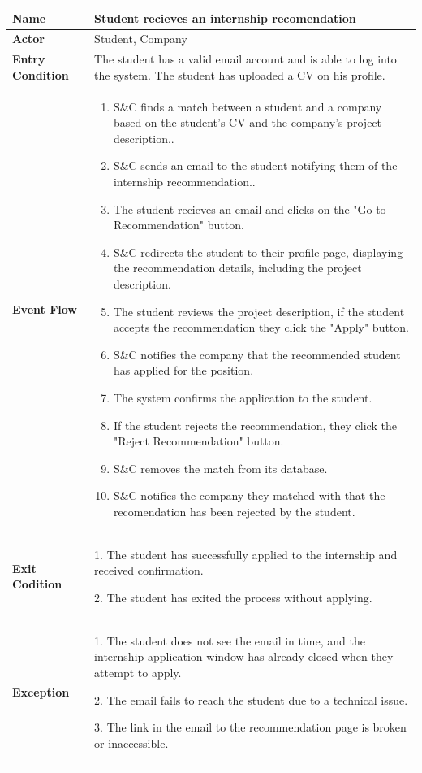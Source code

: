 \begin{longtable}{|p{}|p{}|}
\hline
\textbf{Name} &  Student recieves an internship recomendation\\
\hline
\textbf{Actor} &  Student, Company\\
\hline
\textbf{Entry Condition} &  The student has a valid email account and is able to log into the system. The student has uploaded a CV on his profile.\\
\hline
\textbf{Event Flow} &  
\begin{enumerate}
\item S\&C finds a match between a student and a company based on the student's CV and the company’s project description..
\item S\&C sends an email to the student notifying them of the internship recommendation..
\item The student recieves an email and clicks on the "Go to Recommendation" button.
\item S\&C redirects the student to their profile page, displaying the recommendation details, including the project description.
\item The student reviews the project description, if the student accepts the recommendation they click the "Apply" button.
\item S\&C notifies the company that the recommended student has applied for the position.
\item The system confirms the application to the student.
\item If the student rejects the recommendation, they click the "Reject Recommendation" button.
\item S\&C removes the match from its database.
\item S\&C notifies the company they matched with that the recomendation has been rejected by the student. 
\end{enumerate}
\\
\hline
\textbf{Exit Codition} & 
1. The student has successfully applied to the internship and received confirmation.

2. The student has exited the process without applying.\\
\hline
\textbf{Exception} &  
    1. The student does not see the email in time, and the internship application window has already closed when they attempt to apply.	
    
    2. The email fails to reach the student due to a technical issue.	
    
    3. The link in the email to the recommendation page is broken or inaccessible.\\
\hline
\end{longtable}

